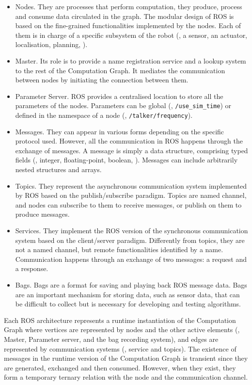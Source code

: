 \begin{itemize}
\item Nodes. They are processes that perform computation, they produce, process and consume data circulated in the graph. The modular design of ROS is based on the fine-grained functionalities implemented by the nodes. Each of them is in charge of a specific subsystem of the robot (\eg, a sensor, an actuator, localisation, planning, \etc). 
\item Master. Its role is to provide a name registration service and a lookup system to the rest of the Computation Graph. It mediates the communication between nodes by initiating the connection between them. 
\item Parameter Server. ROS provides a centralised location to store all the parameters of the nodes. Parameters can be global (\eg, \texttt{/use\_sim\_time}) or defined in the namespace of a node (\eg, \texttt{/talker/frequency}).
\item Messages. They can appear in various forms depending on the specific protocol used. However, all the communication in ROS happens through the exchange of messages. A message is simply a data structure, comprising typed fields (\eg, integer, floating-point, boolean, \etc). Messages can include arbitrarily nested structures and arrays.
\item Topics. They represent the asynchronous communication system implemented by ROS based on the publish/subscribe paradigm. Topics are named channel, and nodes can subscribe to them to receive messages, or publish on them to produce messages.
\item Services. They implement the ROS version of the synchronous communication system based on the client/server par\-a\-digm. Differently from topics, they are not a named channel, but remote functionalities identified by a name. Communication happens through an exchange of two messages: a request and a response.
\item Bags. Bags are a format for saving and playing back ROS message data. Bags are an important mechanism for storing data, such as sensor data, that can be difficult to collect but is necessary for developing and testing algorithms. 
\end{itemize}

Each ROS architecture represents a runtime instantiation of the Computation Graph where vertices are represented by nodes and the other active elements (\ie, Master, Parameter server, and the bag recording system), and edges are represented by communication systems (\ie, service and topics). The existence of messages in the runtime version of the Computation Graph is transient since they are generated, exchanged and then consumed. However, when they exist, they form a temporary ternary relation with the node and the communication channel.

